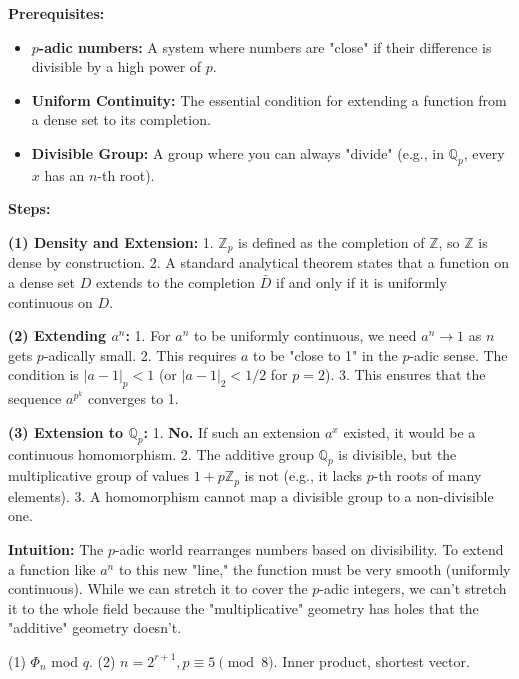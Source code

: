 \begin{solution}
\textbf{Prerequisites:}
\begin{itemize}
    \item \textbf{$p$-adic numbers:} A system where numbers are "close" if their difference is divisible by a high power of $p$.
    \item \textbf{Uniform Continuity:} The essential condition for extending a function from a dense set to its completion.
    \item \textbf{Divisible Group:} A group where you can always "divide" (e.g., in $\mathbb{Q}_p$, every $x$ has an $n$-th root).
\end{itemize}

\textbf{Steps:}

\textbf{(1) Density and Extension:}
1. $\mathbb{Z}_p$ is defined as the completion of $\mathbb{Z}$, so $\mathbb{Z}$ is dense by construction.
2. A standard analytical theorem states that a function on a dense set $D$ extends to the completion $\bar{D}$ if and only if it is uniformly continuous on $D$.

\textbf{(2) Extending $a^n$:}
1. For $a^n$ to be uniformly continuous, we need $a^n \to 1$ as $n$ gets $p$-adically small.
2. This requires $a$ to be "close to 1" in the $p$-adic sense. The condition is $|a-1|_p < 1$ (or $|a-1|_2 < 1/2$ for $p=2$).
3. This ensures that the sequence $a^{p^k}$ converges to 1.

\textbf{(3) Extension to $\mathbb{Q}_p$:}
1. \textbf{No.} If such an extension $a^x$ existed, it would be a continuous homomorphism.
2. The additive group $\mathbb{Q}_p$ is divisible, but the multiplicative group of values $1 + p\mathbb{Z}_p$ is not (e.g., it lacks $p$-th roots of many elements).
3. A homomorphism cannot map a divisible group to a non-divisible one.

\textbf{Intuition:}
The $p$-adic world rearranges numbers based on divisibility. To extend a function like $a^n$ to this new "line," the function must be very smooth (uniformly continuous). While we can stretch it to cover the $p$-adic integers, we can't stretch it to the whole field because the "multiplicative" geometry has holes that the "additive" geometry doesn't.
\end{solution}

\begin{exercise}
\label{algebra:2024:6}
(1) $\Phi_n$ mod $q$.
(2) $n = 2^{r+1}, p \equiv 5 \pmod 8$. Inner product, shortest vector.
\end{exercise}

